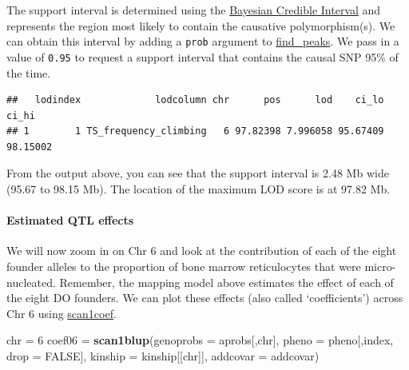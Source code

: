 \documentclass[]{article}
\newenvironment{Shaded}{\begin{snugshade}}{\end{snugshade}}
\newcommand{\KeywordTok}[1]{\textcolor[rgb]{0.13,0.29,0.53}{\textbf{#1}}}
\newcommand{\DataTypeTok}[1]{\textcolor[rgb]{0.13,0.29,0.53}{#1}}
\newcommand{\DecValTok}[1]{\textcolor[rgb]{0.00,0.00,0.81}{#1}}
\newcommand{\FloatTok}[1]{\textcolor[rgb]{0.00,0.00,0.81}{#1}}
\newcommand{\StringTok}[1]{\textcolor[rgb]{0.31,0.60,0.02}{#1}}
\newcommand{\OtherTok}[1]{\textcolor[rgb]{0.56,0.35,0.01}{#1}}
\newcommand{\OperatorTok}[1]{\textcolor[rgb]{0.81,0.36,0.00}{\textbf{#1}}}
\newcommand{\NormalTok}[1]{#1}
\let\oldparagraph\paragraph
\renewcommand{\paragraph}[1]{\oldparagraph{#1}\mbox{}}
\begin{document}
The support interval is determined using the
\href{http://www.ncbi.nlm.nih.gov/pubmed/11560912}{Bayesian Credible
Interval} and represents the region most likely to contain the causative
polymorphism(s). We can obtain this interval by adding a \texttt{prob}
argument to
\href{https://github.com/rqtl/qtl2/blob/master/R/find_peaks.R}{find\_peaks}.
We pass in a value of \texttt{0.95} to request a support interval that
contains the causal SNP 95\% of the time.

\begin{Shaded}
\end{Shaded}

\begin{verbatim}
##   lodindex             lodcolumn chr      pos      lod    ci_lo    ci_hi
## 1        1 TS_frequency_climbing   6 97.82398 7.996058 95.67409 98.15002
\end{verbatim}

From the output above, you can see that the support interval is 2.48 Mb
wide (95.67 to 98.15 Mb). The location of the maximum LOD score is at
97.82 Mb.

\paragraph{Estimated QTL effects}\label{estimated-qtl-effects}

We will now zoom in on Chr 6 and look at the contribution of each of the
eight founder alleles to the proportion of bone marrow reticulocytes
that were micro-nucleated. Remember, the mapping model above estimates
the effect of each of the eight DO founders. We can plot these effects
(also called `coefficients') across Chr 6 using
\href{https://github.com/rqtl/qtl2/blob/master/R/scan1coef.R}{scan1coef}.

\begin{Shaded}
\begin{Highlighting}[]
\NormalTok{chr =}\StringTok{ }\DecValTok{6}
\NormalTok{coef06 =}\StringTok{ }\KeywordTok{scan1blup}\NormalTok{(}\DataTypeTok{genoprobs =}\NormalTok{ aprobs[,chr], }\DataTypeTok{pheno =}\NormalTok{ pheno[,index, }\DataTypeTok{drop =} \OtherTok{FALSE}\NormalTok{], }\DataTypeTok{kinship =}\NormalTok{ kinship[[chr]], }\DataTypeTok{addcovar =}\NormalTok{ addcovar)}
\end{Highlighting}
\end{Shaded}
\end{document}
